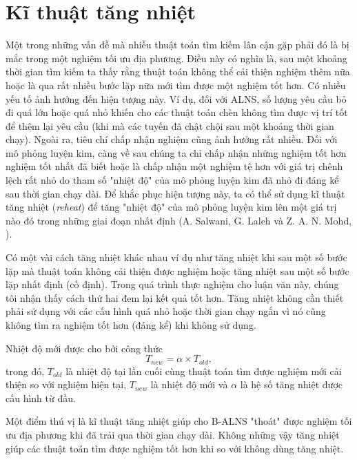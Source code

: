\section{Kĩ thuật tăng nhiệt}
\label{sec:reheat}
Một trong những vấn đề mà nhiều thuật toán tìm kiếm lân cận gặp phải đó là bị mắc trong một nghiệm tối ưu địa phương. Điều này có nghĩa là, sau một khoảng thời gian tìm kiếm ta thấy rằng thuật toán không thể cải thiện nghiệm thêm nữa hoặc là qua rất nhiều bước lặp nữa mới tìm được một nghiệm tốt hơn. Có nhiều yếu tố ảnh hưởng đến hiện tượng này. Ví dụ, đối với ALNS, số lượng yêu cầu bỏ đi quá lớn hoặc quá nhỏ khiến cho các thuật toán chèn không tìm được vị trí tốt để thêm lại yêu cầu (khi mà các tuyến đã chật chội sau một khoảng thời gian chạy). Ngoài ra, tiêu chí chấp nhận nghiệm cũng ảnh hưởng rất nhiều. Đối với mô phỏng luyện kim, càng về sau chúng ta chỉ chấp nhận những nghiệm tốt hơn nghiệm tốt nhất đã biết hoặc là chấp nhận một nghiệm tệ hơn với giá trị chênh lệch rất nhỏ do tham số "nhiệt độ" của mô phỏng luyện kim đã nhỏ đi đáng kể sau thời gian chạy dài. Để khắc phục hiện tượng này, ta có thể sử dụng kĩ thuật tăng nhiệt (\textit{reheat}) để tăng "nhiệt độ" của mô phỏng luyện kim lên một giá trị nào đó trong những giai đoạn nhất định (A. Salwani, G. Laleh và Z. A. N. Mohd, \cite{salwani2011re}). 

Có một vài cách tăng nhiệt khác nhau ví dụ như tăng nhiệt khi sau một số bước lặp mà thuật toán không cải thiện được nghiệm hoặc tăng nhiệt sau một số bước lặp nhất định (cố định). Trong quá trình thực nghiệm cho luận văn này, chúng tôi nhận thấy cách thứ hai đem lại kết quả tốt hơn. Tăng nhiệt không cần thiết phải sử dụng với các cấu hình quá nhỏ hoặc thời gian chạy ngắn vì nó cũng không tìm ra nghiệm tốt hơn (đáng kể) khi không sử dụng. 

Nhiệt độ mới được cho bởi công thức
\begin{equation}
  T_{new} = \alpha \times T_{old},
\end{equation}
trong đó, $T_{old}$ là nhiệt độ tại lần cuối cùng thuật toán tìm được nghiệm mới cải thiện so với nghiệm hiện tại, $T_{new}$ là nhiệt độ mới và $\alpha$ là hệ số tăng nhiệt được cấu hình từ đầu.

Một điểm thú vị là kĩ thuật tăng nhiệt giúp cho B-ALNS "thoát" được nghiệm tối ưu địa phương khi đã trải qua thời gian chạy dài. Không những vậy tăng nhiệt giúp các thuật toán tìm được nghiệm tốt hơn khi so với không dùng tăng nhiệt.


